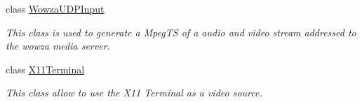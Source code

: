 \begin{DoxyCompactItemize}
class \hyperlink{classbr_1_1ufscar_1_1lince_1_1streaming_1_1WowzaUDPInput}{WowzaUDPInput}
\begin{DoxyCompactList}\small\item\em This class is used to generate a MpegTS of a audio and video stream addressed to the wowza media server. \item\end{DoxyCompactList}\item 
class \hyperlink{classbr_1_1ufscar_1_1lince_1_1streaming_1_1X11Terminal}{X11Terminal}
\begin{DoxyCompactList}\small\item\em This class allow to use the X11 Terminal as a video source. \item\end{DoxyCompactList}\end{DoxyCompactItemize}
